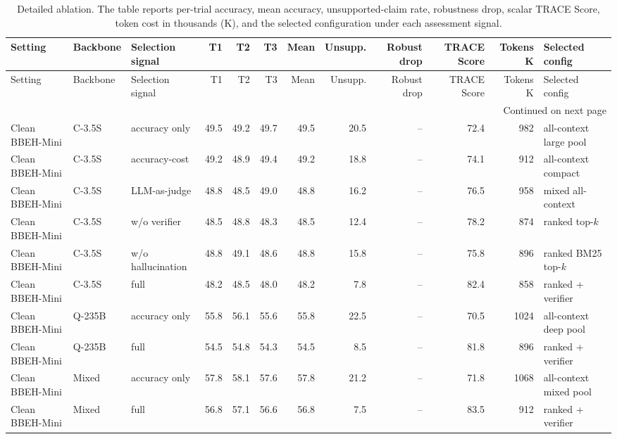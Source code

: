 ﻿\begingroup
\scriptsize
\setlength{\tabcolsep}{2.2pt}
\setlength{\LTleft}{\fill}
\setlength{\LTright}{\fill}
\begin{longtable}{lllrrrrrrrrl}
\caption{Detailed \tracescore{} ablation. The table reports per-trial accuracy, mean accuracy, unsupported-claim rate, robustness drop, scalar TRACE Score, token cost in thousands (K), and the selected configuration under each assessment signal.}\label{tab:trace-score-detailed}\\
\toprule
Setting & Backbone & Selection signal & T1 & T2 & T3 & Mean & Unsupp. & Robust drop & TRACE Score & Tokens K & Selected config \\
\midrule
\endfirsthead
\toprule
Setting & Backbone & Selection signal & T1 & T2 & T3 & Mean & Unsupp. & Robust drop & TRACE Score & Tokens K & Selected config \\
\midrule
\endhead
\midrule
\multicolumn{12}{r}{\scriptsize Continued on next page}\\
\endfoot
\bottomrule
\endlastfoot
Clean BBEH-Mini & C-3.5S & accuracy only & 49.5 & 49.2 & 49.7 & 49.5 & 20.5 & -- & 72.4 & 982 & all-context large pool \\
Clean BBEH-Mini & C-3.5S & accuracy-cost & 49.2 & 48.9 & 49.4 & 49.2 & 18.8 & -- & 74.1 & 912 & all-context compact \\
Clean BBEH-Mini & C-3.5S & LLM-as-judge & 48.8 & 48.5 & 49.0 & 48.8 & 16.2 & -- & 76.5 & 958 & mixed all-context \\
Clean BBEH-Mini & C-3.5S & \tracescore{} w/o verifier & 48.5 & 48.8 & 48.3 & 48.5 & 12.4 & -- & 78.2 & 874 & ranked top-$k$ \\
Clean BBEH-Mini & C-3.5S & \tracescore{} w/o hallucination & 48.8 & 49.1 & 48.6 & 48.8 & 15.8 & -- & 75.8 & 896 & ranked BM25 top-$k$ \\
\rowcolor{tracesoft}
Clean BBEH-Mini & C-3.5S & full \tracescore{} & 48.2 & 48.5 & 48.0 & 48.2 & 7.8 & -- & 82.4 & 858 & ranked + verifier \\
Clean BBEH-Mini & Q-235B & accuracy only & 55.8 & 56.1 & 55.6 & 55.8 & 22.5 & -- & 70.5 & 1024 & all-context deep pool \\
\rowcolor{tracesoft}
Clean BBEH-Mini & Q-235B & full \tracescore{} & 54.5 & 54.8 & 54.3 & 54.5 & 8.5 & -- & 81.8 & 896 & ranked + verifier \\
Clean BBEH-Mini & Mixed & accuracy only & 57.8 & 58.1 & 57.6 & 57.8 & 21.2 & -- & 71.8 & 1068 & all-context mixed pool \\
\rowcolor{tracesoft}
Clean BBEH-Mini & Mixed & full \tracescore{} & 56.8 & 57.1 & 56.6 & 56.8 & 7.5 & -- & 83.5 & 912 & ranked + verifier \\

\end{longtable}
